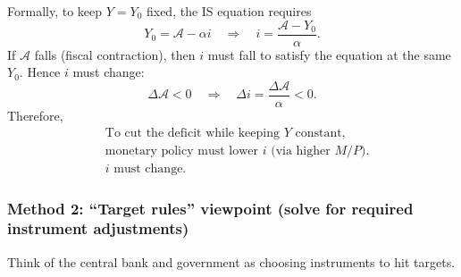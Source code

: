 \documentclass[12pt]{article}
\begin{document}
\begin{enumerate}[label=(\alph*)]
Formally, to keep \(Y=Y_0\) fixed, the IS equation requires
\[
Y_0 = \mathcal{A} - \alpha i
\quad\Longrightarrow\quad
i = \frac{\mathcal{A}-Y_0}{\alpha}.
\]
If \(\mathcal{A}\) falls (fiscal contraction), then \(i\) must fall to satisfy the equation at the same \(Y_0\). Hence \(i\) must change:
\[
\Delta\mathcal{A}<0\quad\Longrightarrow\quad \Delta i = \frac{\Delta\mathcal{A}}{\alpha}<0.
\]
Therefore,
\[
\boxed{
\begin{aligned}
&\text{To cut the deficit while keeping } Y \text{ constant,} \\
&\text{monetary policy must lower } i \text{ (via higher } M/P). \\
&i \text{ must change.}
\end{aligned}
}
\]
\end{enumerate}

\subsubsection*{Method 2: ``Target rules'' viewpoint (solve for required instrument adjustments)}
Think of the central bank and government as choosing instruments to hit targets.
\end{document}
